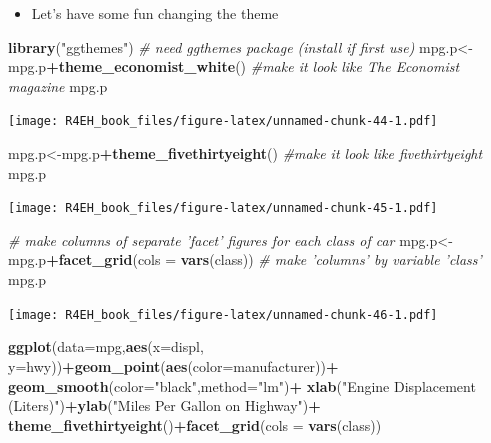 \documentclass[]{book}
\newenvironment{Shaded}{\begin{snugshade}}{\end{snugshade}}
\newcommand{\KeywordTok}[1]{\textcolor[rgb]{0.13,0.29,0.53}{\textbf{#1}}}
\newcommand{\DataTypeTok}[1]{\textcolor[rgb]{0.13,0.29,0.53}{#1}}
\newcommand{\StringTok}[1]{\textcolor[rgb]{0.31,0.60,0.02}{#1}}
\newcommand{\CommentTok}[1]{\textcolor[rgb]{0.56,0.35,0.01}{\textit{#1}}}
\newcommand{\OperatorTok}[1]{\textcolor[rgb]{0.81,0.36,0.00}{\textbf{#1}}}
\newcommand{\NormalTok}[1]{#1}
\providecommand{\tightlist}{%
  \setlength{\itemsep}{0pt}\setlength{\parskip}{0pt}}
\theoremstyle{definition}
\theoremstyle{definition}
\theoremstyle{definition}
\theoremstyle{remark}
\begin{document}
\begin{itemize}
\tightlist
\item
  Let's have some fun changing the theme
\end{itemize}

\begin{Shaded}
\begin{Highlighting}[]
\KeywordTok{library}\NormalTok{(}\StringTok{"ggthemes"}\NormalTok{) }\CommentTok{# need ggthemes package (install if first use)}
\NormalTok{mpg.p<-mpg.p}\OperatorTok{+}\KeywordTok{theme_economist_white}\NormalTok{() }\CommentTok{#make it look like The Economist magazine}
\NormalTok{mpg.p}
\end{Highlighting}
\end{Shaded}

\texttt{[image: R4EH\_book\_files/figure-latex/unnamed-chunk-44-1.pdf]}

\begin{Shaded}
\begin{Highlighting}[]
\NormalTok{mpg.p<-mpg.p}\OperatorTok{+}\KeywordTok{theme_fivethirtyeight}\NormalTok{() }\CommentTok{#make it look like fivethirtyeight}
\NormalTok{mpg.p}
\end{Highlighting}
\end{Shaded}

\texttt{[image: R4EH\_book\_files/figure-latex/unnamed-chunk-45-1.pdf]}

\begin{Shaded}
\begin{Highlighting}[]
\CommentTok{# make columns of separate 'facet' figures for each class of car}
\NormalTok{mpg.p<-mpg.p}\OperatorTok{+}\KeywordTok{facet_grid}\NormalTok{(}\DataTypeTok{cols =} \KeywordTok{vars}\NormalTok{(class)) }\CommentTok{# make 'columns' by variable 'class'}
\NormalTok{mpg.p}
\end{Highlighting}
\end{Shaded}

\texttt{[image: R4EH\_book\_files/figure-latex/unnamed-chunk-46-1.pdf]}

\begin{Shaded}
\begin{Highlighting}[]
\KeywordTok{ggplot}\NormalTok{(}\DataTypeTok{data=}\NormalTok{mpg,}\KeywordTok{aes}\NormalTok{(}\DataTypeTok{x=}\NormalTok{displ, }\DataTypeTok{y=}\NormalTok{hwy))}\OperatorTok{+}\KeywordTok{geom_point}\NormalTok{(}\KeywordTok{aes}\NormalTok{(}\DataTypeTok{color=}\NormalTok{manufacturer))}\OperatorTok{+}
\StringTok{  }\KeywordTok{geom_smooth}\NormalTok{(}\DataTypeTok{color=}\StringTok{"black"}\NormalTok{,}\DataTypeTok{method=}\StringTok{"lm"}\NormalTok{)}\OperatorTok{+}
\StringTok{  }\KeywordTok{xlab}\NormalTok{(}\StringTok{"Engine Displacement (Liters)"}\NormalTok{)}\OperatorTok{+}\KeywordTok{ylab}\NormalTok{(}\StringTok{"Miles Per Gallon on Highway"}\NormalTok{)}\OperatorTok{+}
\StringTok{  }\KeywordTok{theme_fivethirtyeight}\NormalTok{()}\OperatorTok{+}\KeywordTok{facet_grid}\NormalTok{(}\DataTypeTok{cols =} \KeywordTok{vars}\NormalTok{(class)) }
\end{Highlighting}
\end{Shaded}
\end{document}
